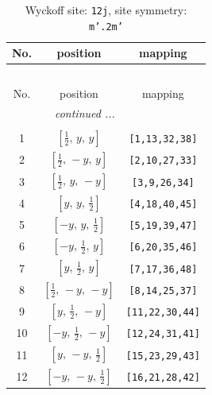\documentclass[fleqn,8pt]{jsarticle}
\begin{document}
\begin{longtable}{ccc}
\caption{Wyckoff site: {\tt 12j}, site symmetry: {\tt m'.2m'}}
 \\
 \hline \hline
No. & position & mapping \\ \hline \endfirsthead

\multicolumn{2}{l}{\tablename\ \thetable{}} \\
 \hline \hline
No. & position & mapping \\ \hline \endhead

 \hline \hline
\multicolumn{2}{r}{\footnotesize\it continued ...} \\ \endfoot

 \hline \hline
\multicolumn{2}{r}{} \\ \endlastfoot

1 & $\left[ \frac{1}{2},\, y,\, y \right]$ & {\tt [1,13,32,38]} \\ \hline
2 & $\left[ \frac{1}{2},\, - y,\, y \right]$ & {\tt [2,10,27,33]} \\ \hline
3 & $\left[ \frac{1}{2},\, y,\, - y \right]$ & {\tt [3,9,26,34]} \\ \hline
4 & $\left[ y,\, y,\, \frac{1}{2} \right]$ & {\tt [4,18,40,45]} \\ \hline
5 & $\left[ - y,\, y,\, \frac{1}{2} \right]$ & {\tt [5,19,39,47]} \\ \hline
6 & $\left[ - y,\, \frac{1}{2},\, y \right]$ & {\tt [6,20,35,46]} \\ \hline
7 & $\left[ y,\, \frac{1}{2},\, y \right]$ & {\tt [7,17,36,48]} \\ \hline
8 & $\left[ \frac{1}{2},\, - y,\, - y \right]$ & {\tt [8,14,25,37]} \\ \hline
9 & $\left[ y,\, \frac{1}{2},\, - y \right]$ & {\tt [11,22,30,44]} \\ \hline
10 & $\left[ - y,\, \frac{1}{2},\, - y \right]$ & {\tt [12,24,31,41]} \\ \hline
11 & $\left[ y,\, - y,\, \frac{1}{2} \right]$ & {\tt [15,23,29,43]} \\ \hline
12 & $\left[ - y,\, - y,\, \frac{1}{2} \right]$ & {\tt [16,21,28,42]} \\
\end{longtable}
\renewcommand{\arraystretch}{1.2}
\end{document}
